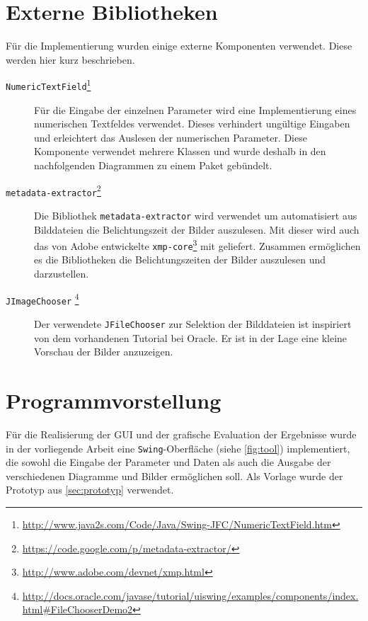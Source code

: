 \section{Externe Bibliotheken}
\label{externals}
Für die Implementierung wurden einige externe Komponenten verwendet. Diese werden hier kurz beschrieben.
\begin{description}
\item[\texttt{NumericTextField}\footnote{\url{http://www.java2s.com/Code/Java/Swing-JFC/NumericTextField.htm}}]
Für die Eingabe der einzelnen Parameter wird eine Implementierung eines numerischen Textfeldes verwendet. Dieses verhindert ungültige Eingaben und erleichtert das Auslesen der numerischen Parameter. Diese Komponente verwendet mehrere Klassen und wurde deshalb in den nachfolgenden Diagrammen zu einem Paket gebündelt.

\item[\texttt{metadata-extractor}\footnote{\url{https://code.google.com/p/metadata-extractor/}}]
Die Bibliothek \texttt{metadata-extractor} wird verwendet um automatisiert aus Bilddateien die Belichtungszeit der Bilder auszulesen. Mit dieser wird auch das von Adobe entwickelte \texttt{xmp-core}\footnote{\url{http://www.adobe.com/devnet/xmp.html}} mit geliefert. Zusammen ermöglichen es die Bibliotheken die Belichtungszeiten der Bilder auszulesen und darzustellen.

\item[\texttt{JImageChooser} \footnote{\url{http://docs.oracle.com/javase/tutorial/uiswing/examples/components/index.html\#FileChooserDemo2}}]
Der verwendete \texttt{JFileChooser} zur Selektion der Bilddateien ist inspiriert von dem vorhandenen Tutorial bei Oracle. Er ist in der Lage eine kleine Vorschau der Bilder anzuzeigen.
\end{description}



\section{Programmvorstellung}

Für die Realisierung der \gls{GUI} und der grafische Evaluation der Ergebnisse wurde in der vorliegende Arbeit eine \texttt{Swing}-Oberfläche (siehe \autoref{fig:tool}) implementiert, die sowohl die Eingabe der Parameter und Daten als auch die Ausgabe der verschiedenen Diagramme und Bilder ermöglichen soll. Als Vorlage wurde der Prototyp aus \autoref{sec:prototyp} verwendet.


